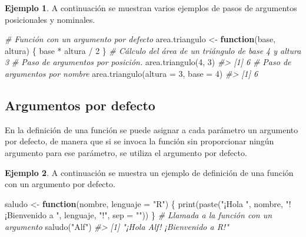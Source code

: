 \documentclass[
]{book}
\newenvironment{Shaded}{\begin{snugshade}}{\end{snugshade}}
\newcommand{\AttributeTok}[1]{\textcolor[rgb]{0.77,0.63,0.00}{#1}}
\newcommand{\CommentTok}[1]{\textcolor[rgb]{0.56,0.35,0.01}{\textit{#1}}}
\newcommand{\ControlFlowTok}[1]{\textcolor[rgb]{0.13,0.29,0.53}{\textbf{#1}}}
\newcommand{\DecValTok}[1]{\textcolor[rgb]{0.00,0.00,0.81}{#1}}
\newcommand{\FunctionTok}[1]{\textcolor[rgb]{0.00,0.00,0.00}{#1}}
\newcommand{\NormalTok}[1]{#1}
\newcommand{\OtherTok}[1]{\textcolor[rgb]{0.56,0.35,0.01}{#1}}
\newcommand{\SpecialCharTok}[1]{\textcolor[rgb]{0.00,0.00,0.00}{#1}}
\newcommand{\StringTok}[1]{\textcolor[rgb]{0.31,0.60,0.02}{#1}}
\theoremstyle{definition}
\theoremstyle{definition}
\newtheorem{example}{Ejemplo}[chapter]
\theoremstyle{definition}
\theoremstyle{definition}
\theoremstyle{remark}
\begin{document}
\begin{example}

A continuación se muestran varios ejemplos de pasos de argumentos posicionales y nominales.

\begin{Shaded}
\begin{Highlighting}[]
\CommentTok{\# Función con un argumento por defecto}
\NormalTok{area.triangulo }\OtherTok{\textless{}{-}} \ControlFlowTok{function}\NormalTok{(base, altura) \{}
\NormalTok{  base }\SpecialCharTok{*}\NormalTok{ altura }\SpecialCharTok{/} \DecValTok{2}
\NormalTok{\}}
\CommentTok{\# Cálculo del área de un triángulo de base 4 y altura 3}
\CommentTok{\# Paso de argumentos por posición. }
\FunctionTok{area.triangulo}\NormalTok{(}\DecValTok{4}\NormalTok{, }\DecValTok{3}\NormalTok{)}
\CommentTok{\#\textgreater{} [1] 6}
\CommentTok{\# Paso de argumentos por nombre}
\FunctionTok{area.triangulo}\NormalTok{(}\AttributeTok{altura =} \DecValTok{3}\NormalTok{, }\AttributeTok{base =} \DecValTok{4}\NormalTok{)}
\CommentTok{\#\textgreater{} [1] 6}
\end{Highlighting}
\end{Shaded}

\end{example}

\hypertarget{argumentos-por-defecto}{%
\subsection{Argumentos por defecto}\label{argumentos-por-defecto}}

En la definición de una función se puede asignar a cada parámetro un argumento por defecto, de manera que si se invoca la función sin proporcionar ningún argumento para ese parámetro, se utiliza el argumento por defecto.

\begin{example}

A continuación se muestra un ejemplo de definición de una función con un argumento por defecto.

\begin{Shaded}
\begin{Highlighting}[]
\NormalTok{saludo }\OtherTok{\textless{}{-}} \ControlFlowTok{function}\NormalTok{(nombre, }\AttributeTok{lenguaje =} \StringTok{"R"}\NormalTok{) \{}
  \FunctionTok{print}\NormalTok{(}\FunctionTok{paste}\NormalTok{(}\StringTok{"¡Hola "}\NormalTok{, nombre, }\StringTok{"! ¡Bienvenido a "}\NormalTok{, lenguaje, }\StringTok{"!"}\NormalTok{, }\AttributeTok{sep =} \StringTok{""}\NormalTok{))}
\NormalTok{\}}
\CommentTok{\# Llamada a la función con un argumento}
\FunctionTok{saludo}\NormalTok{(}\StringTok{"Alf"}\NormalTok{)}
\CommentTok{\#\textgreater{} [1] "¡Hola Alf! ¡Bienvenido a R!"}
\end{Highlighting}
\end{Shaded}

\end{example}
\end{document}
